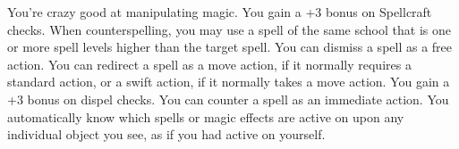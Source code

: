 {You're crazy good at manipulating magic.}
{You gain a +3 bonus on Spellcraft checks.}
{When counterspelling, you may use a spell of the same school that is one or more spell levels higher than the target spell.}
{You can dismiss a spell as a free action. You can redirect a spell as a move action, if it normally requires a standard action, or a swift action, if it normally takes a move action. You gain a +3 bonus on dispel checks.}
{You can counter a spell as an immediate action.}
{You automatically know which spells or magic effects are active on upon any individual object you see, as if you had  active on yourself.}
